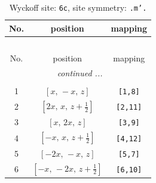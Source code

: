 \documentclass[fleqn,8pt]{jsarticle}
\begin{document}
\renewcommand{\arraystretch}{1.2}
\begin{longtable}{ccc}
\caption{Wyckoff site: {\tt 6c}, site symmetry: {\tt .m'.}}
 \\
 \hline \hline
No. & position & mapping \\ \hline \endfirsthead

\multicolumn{2}{l}{\tablename\ \thetable{}} \\
 \hline \hline
No. & position & mapping \\ \hline \endhead

 \hline \hline
\multicolumn{2}{r}{\footnotesize\it continued ...} \\ \endfoot

 \hline \hline
\multicolumn{2}{r}{} \\ \endlastfoot

1 & $\left[ x,\, - x,\, z \right]$ & {\tt [1,8]} \\ \hline
2 & $\left[ 2 x,\, x,\, z + \frac{1}{2} \right]$ & {\tt [2,11]} \\ \hline
3 & $\left[ x,\, 2 x,\, z \right]$ & {\tt [3,9]} \\ \hline
4 & $\left[ - x,\, x,\, z + \frac{1}{2} \right]$ & {\tt [4,12]} \\ \hline
5 & $\left[ - 2 x,\, - x,\, z \right]$ & {\tt [5,7]} \\ \hline
6 & $\left[ - x,\, - 2 x,\, z + \frac{1}{2} \right]$ & {\tt [6,10]} \\
\end{longtable}
\renewcommand{\arraystretch}{1.2}
\end{document}
